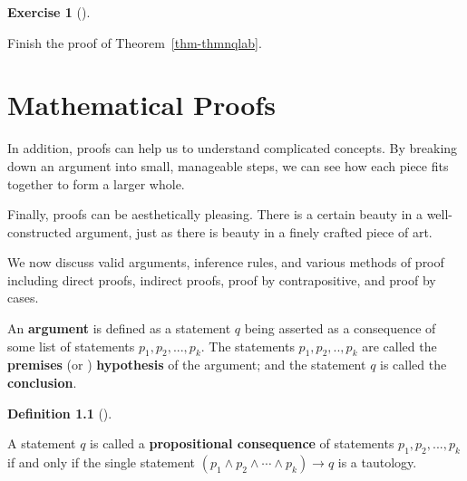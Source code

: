 \documentclass[
  letterpaper,
  10pt,
  reqno,
  twopage,
  openany]{book}
\theoremstyle{plain}
\theoremstyle{definition}
\newtheorem{exercise}{Exercise}[chapter]
\theoremstyle{definition}
\newtheorem{definition}{Definition}[chapter]
\theoremstyle{definition}
\theoremstyle{plain}
\theoremstyle{plain}
\theoremstyle{remark}
\begin{document}
\leavevmode{}%
\begin{exercise}[]\label{exr-nqlab}

Finish the proof of Theorem~\ref{thm-thmnqlab}.

\end{exercise}


\hypertarget{mathematical-proofs}{%
\chapter{Mathematical Proofs}\label{mathematical-proofs}}

In addition, proofs can help us to understand complicated concepts. By
breaking down an argument into small, manageable steps, we can see how
each piece fits together to form a larger whole.

Finally, proofs can be aesthetically pleasing. There is a certain beauty
in a well-constructed argument, just as there is beauty in a finely
crafted piece of art.

We now discuss valid arguments, inference rules, and various methods of
proof including direct proofs, indirect proofs, proof by contrapositive,
and proof by cases.

An  \textbf{argument} is defined as a statement \(q\)
being asserted as a consequence of some list of statements
\(p_1, p_2, ...,p_k\). The statements \(p_1, p_2, ..,p_k\) are called
the  \textbf{premises} (or )
\textbf{hypothesis} of the argument; and the statement \(q\) is called
the  \textbf{conclusion}.

\leavevmode{}%
\begin{definition}[]\label{def-valargu}

A statement \(q\) is called a 
\textbf{propositional consequence} of statements \(p_1, p_2, ..., p_k\)
if and only if the single statement
\((p_1 \land p_2 \land \cdots \land p_k) \rightarrow q\) is a tautology.

\end{definition}
\end{document}
